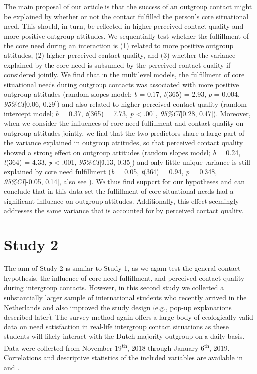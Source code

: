 The main proposal of our article is that the success of an outgroup
contact might be explained by whether or not the contact fulfilled the
person's core situational need. This should, in turn, be reflected in
higher perceived contact quality and more positive outgroup attitudes.
We sequentially test whether the fulfillment of the core need during an
interaction is (1) related to more positive outgroup attitudes, (2)
higher perceived contact quality, and (3) whether the variance explained
by the core need is subsumed by the perceived contact quality if
considered jointly. We find that in the multilevel models, the
fulfillment of core situational needs during outgroup contacts was
associated with more positive outgroup attitudes (random slopes model;
\textit{b} = 0.17, \textit{t}(365) = 2.93, \textit{p} = 0.004,
\textit{95\%CI}{[}0.06, 0.29{]}) and also related to higher perceived
contact quality (random intercept model; \textit{b} = 0.37,
\textit{t}(365) = 7.73, \textit{p} \textless{} .001,
\textit{95\%CI}{[}0.28, 0.47{]}). Moreover, when we consider the
influences of core need fulfillment and contact quality on outgroup
attitudes jointly, we find that the two predictors share a large part of
the variance explained in outgroup attitudes, so that perceived contact
quality showed a strong effect on outgroup attitudes (random slopes
model; \textit{b} = 0.24, \textit{t}(364) = 4.33, \textit{p} \textless{}
.001, \textit{95\%CI}{[}0.13, 0.35{]}) and only little unique variance
is still explained by core need fulfillment (\textit{b} = 0.05,
\textit{t}(364) = 0.94, \textit{p} = 0.348, \textit{95\%CI}{[}-0.05,
0.14{]}, also see ). We thus find support for
our hypotheses and can conclude that in this data set the fulfillment of
core situational needs had a significant influence on outgroup
attitudes. Additionally, this effect seemingly addresses the same
variance that is accounted for by perceived contact quality.

\section{Study 2}

The aim of Study 2 is similar to Study 1, as we again test the general
contact hypothesis, the influence of core need fulfillment, and
perceived contact quality during intergroup contacts. However, in this
second study we collected a substantially larger sample of international
students who recently arrived in the Netherlands and also improved the
study design (e.g., pop-up explanations described later). The survey
method again offers a large body of ecologically valid data on need
satisfaction in real-life intergroup contact situations as these
students will likely interact with the Dutch majority outgroup on a
daily basis. Data were collected from November 19\textsuperscript{th},
2018 through January 6\textsuperscript{th}, 2019. Correlations and
descriptive statistics of the included variables are available in
 and .

